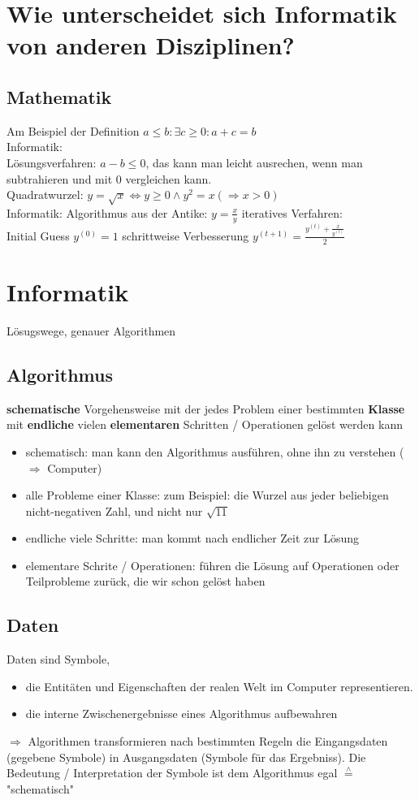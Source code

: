 \documentclass[a4paper]{scrartcl}
\newcommand{\estimates}{\overset{\scriptscriptstyle\wedge}{=}}%
\begin{document}
\section{Wie unterscheidet sich Informatik von anderen Disziplinen?}
\label{sec-3}
\subsection{Mathematik}
\label{sec-3-1}
Am Beispiel der Definition $a \leq b: \exists c \geq 0: a + c = b$ \\
   Informatik: \\
   Lösungsverfahren: $a - b \leq 0$, das kann man leicht ausrechen, wenn man subtrahieren und mit $0$ vergleichen kann. \\
   Quadratwurzel: $y = \sqrt{x} \Leftrightarrow y \geq 0 \wedge y^2 = x (\Rightarrow x > 0)$ \\
   Informatik: Algorithmus aus der Antike: $y = \frac{x}{y}$
iteratives Verfahren: \\
   Initial Guess $y^{(0)} = 1$
schrittweise Verbesserung $y^{(t+1)} = \frac{y^{(t)} + \frac{x}{y^{(t)}}}{2}$
\section{Informatik}
\label{sec-4}
Lösugswege, genauer Algorithmen
\subsection{Algorithmus}
\label{sec-4-1}
\textbf{schematische} Vorgehensweise mit der jedes Problem einer bestimmten \textbf{Klasse} mit \textbf{endliche} vielen \textbf{elementaren} Schritten / Operationen gelöst werden kann
\begin{itemize}
\item schematisch: man kann den Algorithmus ausführen, ohne ihn zu verstehen ($\Rightarrow$ Computer)
\item alle Probleme einer Klasse: zum Beispiel: die Wurzel aus jeder beliebigen nicht-negativen Zahl, und nicht nur $\sqrt{11}$
\item endliche viele Schritte: man kommt nach endlicher Zeit zur Lösung
\item elementare Schrite / Operationen: führen die Lösung auf Operationen oder Teilprobleme zurück, die wir schon gelöst haben
\end{itemize}
\subsection{Daten}
\label{sec-4-2}
Daten sind Symbole,
\begin{itemize}
\item die Entitäten und Eigenschaften der realen Welt im Computer representieren.
\item die interne Zwischenergebnisse eines Algorithmus aufbewahren
\end{itemize}
$\Rightarrow$ Algorithmen transformieren nach bestimmten Regeln die Eingangsdaten (gegebene Symbole) in Ausgangsdaten (Symbole für das Ergebniss).
Die Bedeutung / Interpretation der Symbole ist dem Algorithmus egal $\estimates$ "schematisch"
\end{document}
